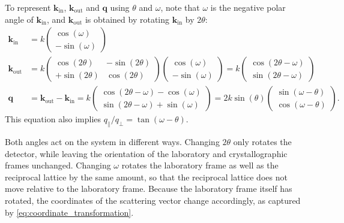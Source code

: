 To represent $\mathbf{k}_{\mathrm{in}}$, $\mathbf{k}_{\mathrm{out}}$ and $\mathbf{q}$ using $\theta$
and $\omega$, note that $\omega$ is the negative polar angle of
$\mathbf{k}_{\mathrm{in}}$, and $\mathbf{k}_{\mathrm{out}}$ is obtained by rotating
$\mathbf{k}_{\mathrm{in}}$ by $2\theta$:
\begin{align}
	\mathbf{k}_{\mathrm{in}}  & = k \begin{pmatrix}\cos(\omega) \\ -\sin(\omega)\end{pmatrix} \nonumber                                                                                                                                                                                                                  \\
	\mathbf{k}_{\mathrm{out}} & = k \begin{pmatrix}\cos(2 \theta) & -\sin(2\theta) \\ +\sin(2\theta) & \cos(2\theta)\end{pmatrix} \begin{pmatrix}\cos(\omega) \\ -\sin(\omega)\end{pmatrix} =k \begin{pmatrix}\cos(2\theta-\omega) \\ \sin(2\theta-\omega)\end{pmatrix} \nonumber                                        \\
	\mathbf{q}                & =\mathbf{k}_{\mathrm{out}}-\mathbf{k}_{\mathrm{in}}=k \begin{pmatrix}\cos(2\theta-\omega)-\cos(\omega) \\ \sin(2\theta-\omega) + \sin(\omega)\end{pmatrix} = 2k \sin(\theta) \begin{pmatrix}\sin(\omega-\theta) \\ \cos(\omega-\theta)\end{pmatrix}. \label{eq:coordinate_transformation}
\end{align}
This equation also implies $q_{\parallel}/ q_{\perp}=\tan(\omega-\theta)$.


Both angles act on the system in different ways. Changing $2\theta$ only rotates the
detector, while leaving the orientation of the laboratory and crystallographic
frames unchanged. Changing $\omega$ rotates the laboratory frame as well as the reciprocal
lattice by the same amount, so that the reciprocal lattice does not move
relative to the laboratory frame. Because the laboratory frame itself has rotated,
the coordinates of the scattering vector change accordingly, as captured by \cref{eq:coordinate_transformation}.

